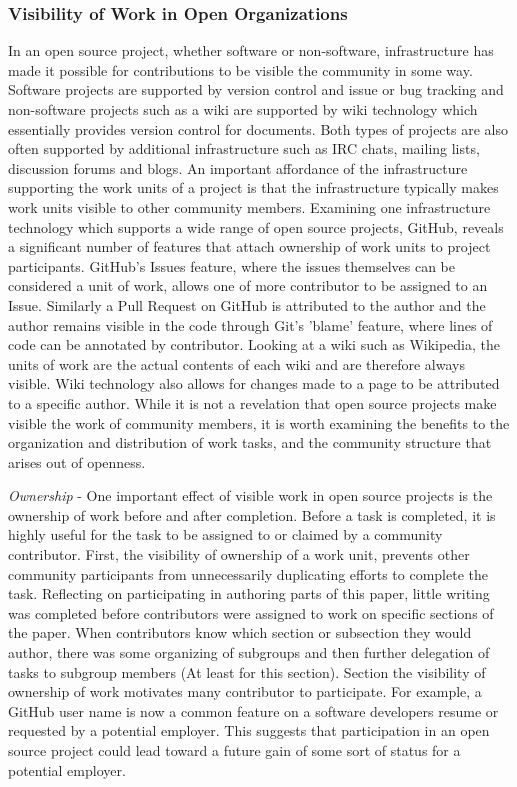 \subsubsection{Visibility of Work in Open Organizations}

In an open source project, whether software or non-software, infrastructure has made it possible for contributions to be visible the community in some way. Software projects are supported by version control and issue or bug tracking and non-software projects such as a wiki are supported by wiki technology which essentially provides version control for documents. Both types of projects are also often supported by additional infrastructure such as IRC chats, mailing lists, discussion forums and blogs. An important affordance of the infrastructure supporting the work units of a project is that the infrastructure typically makes work units visible to other community members. Examining one infrastructure technology which supports a wide range of open source projects, GitHub, reveals a significant number of features that attach ownership of work units to project participants. GitHub's Issues feature, where the issues themselves can be considered a unit of work, allows one of more contributor to be assigned to an Issue. Similarly a Pull Request on GitHub is attributed to the author and the author remains visible in the code through Git's 'blame' feature, where lines of code can be annotated by contributor. Looking at a wiki such as Wikipedia, the units of work are the actual contents of each wiki and are therefore always visible. Wiki technology also allows for changes made to a page to be attributed to a specific author. While it is not a revelation that open source projects make visible the work of community members, it is worth examining the benefits to the organization and distribution of work tasks, and the community structure that arises out of openness.

{\it Ownership} - One important effect of visible work in open source projects is the ownership of work before and after completion. Before a task is completed, it is highly useful for the task to be assigned to or claimed by a community contributor. First, the visibility of ownership of a work unit, prevents other community participants from unnecessarily duplicating efforts to complete the task. Reflecting on participating in authoring parts of this paper, little writing was completed before contributors were assigned to work on specific sections of the paper. When contributors know which section or subsection they would author, there was some organizing of subgroups and then further delegation of tasks to subgroup members (At least for this section). Section the visibility of ownership of work motivates many contributor to participate. For example, a GitHub user name is now a common feature on a software developers resume or requested by a potential employer. This suggests that participation in an open source project could lead toward a future gain of some sort of status for a potential employer.


